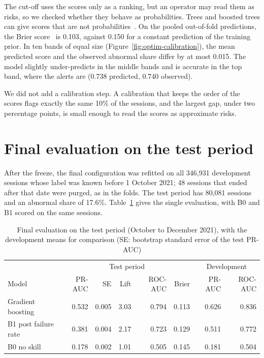 \documentclass[12pt,a4paper,openany]{report}
\begin{document}
The cut-off uses the scores only as a ranking, but an operator may read them as risks, so we checked whether they
behave as probabilities. Trees and boosted trees can give scores that are not probabilities~\cite{mindd04,niculescu2005}.
On the pooled out-of-fold predictions, the Brier score~\cite{brier1950} is 0.103, against 0.150 for a constant
prediction of the training prior. In ten bands of equal size (Figure~\ref{fig:optim-calibration}), the mean
predicted score and the observed abnormal share differ by at most 0.015. The model slightly under-predicts in the
middle bands and is accurate in the top band, where the alerts are (0.738 predicted, 0.740 observed).

We did not add a calibration step. A calibration that keeps the order of the scores flags exactly the same 10\% of
the sessions, and the largest gap, under two percentage points, is small enough to read the scores as approximate
risks.

\section{Final evaluation on the test period}\label{sec:optim-test}

After the freeze, the final configuration was refitted on all 346,931 development sessions whose label was known
before 1 October 2021; 48 sessions that ended after that date were purged, as in the folds. The test period has
80,081 sessions and an abnormal share of 17.6\%. Table~\ref{tab:optim-test} gives the single evaluation, with B0
and B1 scored on the same sessions.

\begin{table}[!htb]
  \centering\small
  \caption{Final evaluation on the test period (October to December 2021), with the development means for comparison (SE: bootstrap standard error of the test \acs{PR-AUC})}
  \label{tab:optim-test}
  \begin{tabular*}{\textwidth}{@{\extracolsep{\fill}}lrrrrrrr}
    \toprule
    & \multicolumn{5}{c}{Test period} & \multicolumn{2}{c}{Development} \\
    Model & \acs{PR-AUC} & SE & Lift & \acs{ROC-AUC} & Brier & \acs{PR-AUC} & \acs{ROC-AUC} \\
    \midrule
    Gradient boosting & 0.532 & 0.005 & 3.03 & 0.794 & 0.113 & 0.626 & 0.836 \\
    B1 post failure rate & 0.381 & 0.004 & 2.17 & 0.723 & 0.129 & 0.511 & 0.772 \\
    B0 no skill & 0.178 & 0.002 & 1.01 & 0.505 & 0.145 & 0.181 & 0.504 \\
    \bottomrule
  \end{tabular*}
\end{table}
\end{document}
